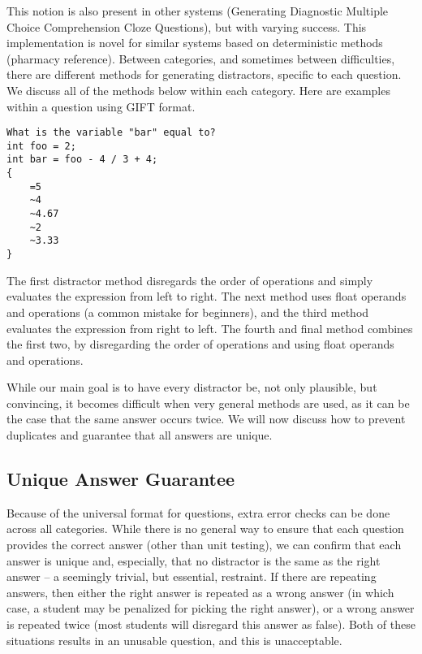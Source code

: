 \documentclass{article}
\begin{document}
This notion is also present in other systems (Generating Diagnostic Multiple Choice Comprehension Cloze Questions), but with varying success. This implementation is novel for similar systems based on deterministic methods (pharmacy reference). Between categories, and sometimes between difficulties, there are different methods for generating distractors, specific to each question. We discuss all of the methods below within each category. Here are examples within a question using GIFT format.

\begin{lstlisting}[breaklines=true, caption={A question with distractors in GIFT format.}, label=lst-distractors]
What is the variable "bar" equal to?
int foo = 2;
int bar = foo - 4 / 3 + 4;
{
	=5
	~4
	~4.67
	~2
	~3.33
}
\end{lstlisting}


The first distractor method disregards the order of operations and simply evaluates the expression from left to right. The next method uses float operands and operations (a common mistake for beginners), and the third method evaluates the expression from right to left. The fourth and final method combines the first two, by disregarding the order of operations and using float operands and operations.

While our main goal is to have every distractor be, not only plausible, but convincing, it becomes difficult when very general methods are used, as it can be the case that the same answer occurs twice. We will now discuss how to prevent duplicates and guarantee that all answers are unique.

\subsection{Unique Answer Guarantee} \label{sec-unique_answer_guarantee}

Because of the universal format for questions, extra error checks can be done across all categories. While there is no general way
to ensure that each question provides the correct answer (other than unit testing), we can confirm that each answer is unique and, especially, that no distractor is the same as the right answer -- a seemingly trivial, but essential, restraint. If there are repeating answers, then either the right answer is repeated as a wrong answer (in which case, a student may be penalized for picking the right answer), or a wrong answer is repeated twice (most students will disregard this answer as false). Both of these situations results in an unusable question, and this is unacceptable. 
\end{document}
